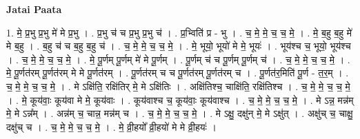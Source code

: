 \documentclass[17pt]{extarticle}
\begin{document}
\textbf{Jatai Paata} \newline

1. मे॒ प्र॒भु प्र॒भु मे॑ मे प्र॒भु । . प्र॒भु च॑ च प्र॒भु प्र॒भु च॑ । . प्र॒भ्विति॑ प्र - भु । . च॒ मे॒ मे॒ च॒ च॒ मे॒ । . मे॒ ब॒हु ब॒हु मे॑ मे ब॒हु । . ब॒हु च॑ च ब॒हु ब॒हु च॑ । . च॒ मे॒ मे॒ च॒ च॒ मे॒ । . मे॒ भूयो॒ भूयो॑ मे मे॒ भूयः॑ । . भूय॑श्च च॒ भूयो॒ भूय॑श्च । . च॒ मे॒ मे॒ च॒ च॒ मे॒ । . मे॒ पू॒र्णम् पू॒र्णम् मे॑ मे पू॒र्णम् । . पू॒र्णम् च॑ च पू॒र्णम् पू॒र्णम् च॑ । . च॒ मे॒ मे॒ च॒ च॒ मे॒ । . मे॒ पू॒र्णत॑रम् पू॒र्णत॑रम् मे मे पू॒र्णत॑रम् । . पू॒र्णत॑रम् च च पू॒र्णत॑रम् पू॒र्णत॑रम् च । . पू॒र्णत॑र॒मिति॑ पू॒र्ण - त॒र॒म् । . च॒ मे॒ मे॒ च॒ च॒ मे॒ । . मे ऽक्षि॑ति॒ रक्षि॑तिर् मे॒ मे ऽक्षि॑तिः । . अक्षि॑तिश्च॒ चाक्षि॑ति॒ रक्षि॑तिश्च । . च॒ मे॒ मे॒ च॒ च॒ मे॒ । . मे॒ कूय॑वाः॒ कूय॑वा मे मे॒ कूय॑वाः । . कूय॑वाश्च च॒ कूय॑वाः॒ कूय॑वाश्च । . च॒ मे॒ मे॒ च॒ च॒ मे॒ । . मे ऽन्न॒ मन्न॑म् मे॒ मे ऽन्न᳚म् । . अन्न॑म् च॒ चान्न॒ मन्न॑म् च । . च॒ मे॒ मे॒ च॒ च॒ मे॒ । . मे ऽक्षु॒ दक्षु॑न् मे॒ मे ऽक्षु॑त् । . अक्षु॑च् च॒ चाक्षु॒ दक्षु॑च् च । . च॒ मे॒ मे॒ च॒ च॒ मे॒ । . मे॒ व्री॒हयो᳚ व्री॒हयो॑ मे मे व्री॒हयः॑ । \newline
\end{document}
